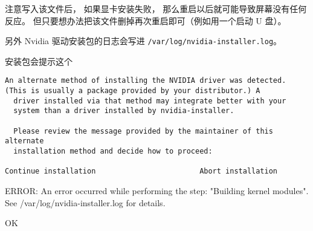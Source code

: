 注意写入该文件后， 如果显卡安装失败， 那么重启以后就可能导致屏幕没有任何反应。 但只要想办法把该文件删掉再次重启即可（例如用一个启动 U 盘）。

另外 Nvidia 驱动安装包的日志会写进 \verb`/var/log/nvidia-installer.log`。

安装包会提示这个
\begin{lstlisting}[language=none]
An alternate method of installing the NVIDIA driver was detected.
(This is usually a package provided by your distributor.) A      
  driver installed via that method may integrate better with your
  system than a driver installed by nvidia-installer.

  Please review the message provided by the maintainer of this alternate
  installation method and decide how to proceed:

Continue installation                        Abort installation 
\end{lstlisting}

ERROR: An error occurred while performing the step: "Building kernel modules". See /var/log/nvidia-installer.log for details.      
        
                                                                  OK 

